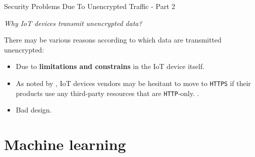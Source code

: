 \documentclass[13.5pt]{beamer}
\begin{document}
\begin{frame}{Security Problems Due To Unencrypted Traffic - Part 2}

\begin{alertblock}{}
\textit{Why IoT devices transmit unencrypted data?}
\end{alertblock}

There may be various reasons according to which data are transmitted unencrypted:

\begin{itemize}
\justifying

\item Due to \textbf{limitations and constrains} in the IoT device itself. 

\item As noted by \citet{mazhar2020characterizing}, IoT devices vendors may be hesitant to move to \texttt{HTTPS} if their products use any third-party resources that are \texttt{HTTP}-only. \cite{mazhar2020characterizing}.

\item Bad design.

\end{itemize}


\end{frame} 
\section{Machine learning}
\end{document}
